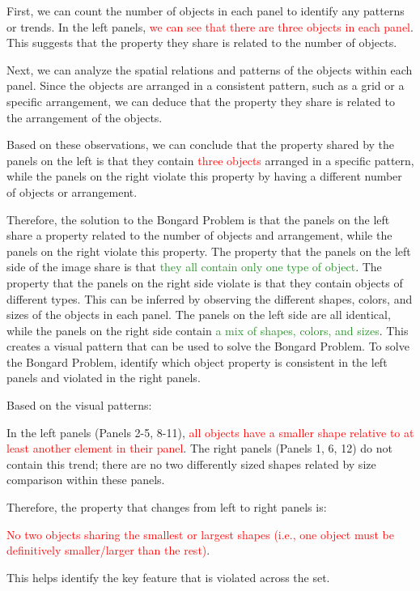 \begin{tcolorbox}[breakable,enhanced jigsaw,opacityback=0,]
\begin{dialogue}
		First, we can count the number of objects in each panel to identify any patterns or trends. In the left panels, \textcolor{red}{we can see that there are three objects in each panel}. This suggests that the property they share is related to the number of objects.
		
		Next, we can analyze the spatial relations and patterns of the objects within each panel. Since the objects are arranged in a consistent pattern, such as a grid or a specific arrangement, we can deduce that the property they share is related to the arrangement of the objects.
		
		Based on these observations, we can conclude that the property shared by the panels on the left is that they contain \textcolor{red}{three objects} arranged in a specific pattern, while the panels on the right violate this property by having a different number of objects or arrangement.
		
		Therefore, the solution to the Bongard Problem is that the panels on the left share a property related to the number of objects and arrangement, while the panels on the right violate this property.
		\vspace{1em}
		 The property that the panels on the left side of the image share is that \textcolor{ForestGreen}{they all contain only one type of object}. The property that the panels on the right side violate is that they contain objects of different types. This can be inferred by observing the different shapes, colors, and sizes of the objects in each panel. The panels on the left side are all identical, while the panels on the right side contain \textcolor{ForestGreen}{a mix of shapes, colors, and sizes}. This creates a visual pattern that can be used to solve the Bongard Problem.
		\vspace{1em}
		 To solve the Bongard Problem, identify which object property is consistent in the left panels and violated in the right panels.
		
		Based on the visual patterns:
		
		In the left panels (Panels 2-5, 8-11), \textcolor{red}{all objects have a smaller shape relative to at least another element in their panel}.
		The right panels (Panels 1, 6, 12) do not contain this trend; there are no two differently sized shapes related by size comparison within these panels.
		
		Therefore, the property that changes from left to right panels is:
		
		\textcolor{red}{No two objects sharing the smallest or largest shapes (i.e., one object must be definitively smaller/larger than the rest)}.
		
		This helps identify the key feature that is violated across the set.
	\end{dialogue}
	\label{fig:task1-bongard}
\end{tcolorbox}
